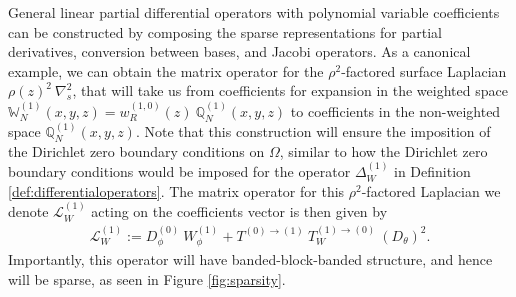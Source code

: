 \documentclass[11pt, oneside]{article}   	%
\newcommand{\genjac}{R}
\newcommand{\genjacw}{w_\genjac}
\newcommand{\bigW}{\mathbb{W}}
\newcommand{\bigscop}{{\mathbb{Q}}}
\newcommand{\bigscopN}{\bigscop_{N}}
\begin{document}
General linear partial differential operators with polynomial variable coefficients can be constructed by composing the sparse representations for partial derivatives, conversion between bases, and Jacobi operators. As a canonical example, we can obtain the matrix operator for the $\rho^2$-factored surface Laplacian $\rho(z)^2 \: \nabla^2_s$, that will take us from coefficients for expansion in the weighted space $\bigW_N^{(1)}(x,y,z) = \genjacw^{(1,0)}(z) \: \bigscopN^{(1)}(x,y,z)$ to coefficients in the non-weighted space $\bigscopN^{(1)}(x,y,z)$. Note that this construction will ensure the imposition of the Dirichlet zero boundary conditions on $\Omega$, similar to how the Dirichlet zero boundary conditions would be imposed for the operator $\Delta^{(1)}_W$ in Definition \ref{def:differentialoperators}. The matrix operator for this $\rho^2$-factored Laplacian we denote $\mathcal{L}_W^{(1)}$ acting on the coefficients vector is then given by
\begin{align*}
    \mathcal{L}_W^{(1)} := D_\phi^{(0)} \: W_\phi^{(1)} + T^{(0)\to(1)} \: T_W^{(1)\to(0)} \: (D_\theta)^2.
\end{align*}
Importantly, this operator will have banded-block-banded structure, and hence will be sparse, as seen in Figure \ref{fig:sparsity}.
\end{document}
